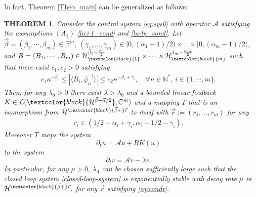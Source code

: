 \documentclass[11pt, dvipsnames]{amsart}
\newtheorem{theorem}{THEOREM}[section]
\begin{document}
In fact, Theorem \ref{Theo_main} can be generalized as follows:
\begin{theorem}\label{Theo_main_general}
Consider the control system \eqref{eq:sys0} with operator $\mathcal{A}$ satisfying the assumptions $(A_{1})$ \eqref{ln+1_cond} and \eqref{ln-lp_cond}. Let $\vec{\beta}=(\beta_1,\cdots,\beta_m)\in\mathbb{R}^m$, $(\gamma_{1},...,\gamma_{m})\in [0,(\alpha_{1}-1)/2)\times ...\times [0,(\alpha_{m}-1)/2)$, and $B=(B_1,\cdots,B_m)\in\mathcal{H}_{\textcolor{black}{1}}^{\beta_1-\frac{\alpha_1}{2}}\times \cdots\times \mathcal{H}_{\textcolor{black}{m}}^{\beta_m-\frac{\alpha_m}{2}}$ such that there exist $c_1, c_2>0$ satisfying
\begin{align}
    c_1n^{-\beta_i}\leq |\langle B_i,\widetilde{\varphi_n}^i\rangle|\leq c_2 n^{-\beta_i+\gamma_{i}}, \quad \forall n\in \mathbb{N}^*,\ i\in\{1,\cdots,m\}.\label{control-cond-general}
\end{align}
 Then, for any $\lambda_0>0$ there exist $\lambda>\lambda_{0}$ and a bounded linear feedback $K\in \mathcal{L}(\textcolor{black}{\mathcal{H}^{\vec{\beta}+\vec{\alpha}/2}},\mathbb{C}^m)$ and a mapping $T$ that is an isomorphism from $\mathcal{H}^{\textcolor{black}{\vec{\beta}+}\vec r}$ to itself with 
\textcolor{black}{$\vec{r} := (r_{1},...,r_{m})$} for any
 \begin{align}
 \label{eq:condr}
     r_i\in(1/2-\alpha_i+\gamma_{i},\alpha_i-1/2-\gamma_{i}).
 \end{align}
Moreover $T$ maps the system
\begin{equation*}
    \partial_t u=\mathcal{A}u+BK(u)
\end{equation*} to the system
\begin{equation*}
    \partial_t v=\mathcal{A}v-\lambda v.
\end{equation*}
In particular, for any $\mu>0$, $\lambda_{0}$ can be chosen sufficiently large such that the closed loop system \eqref{closed-loop-system} is exponentially stable with decay rate $\mu$ in $\mathcal{H}^{\textcolor{black}{\vec{\beta}+}\vec r},$ for any $\vec r$ satisfying \eqref{eq:condr}. 
\end{theorem}
\end{document}
